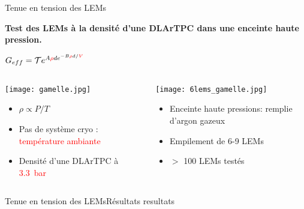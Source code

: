     \begin{frame}{Tenue en tension des LEMs}
    	\begin{scriptsize}
    		\begin{center}
    			\textbf{Test des LEMs à la densité d'une DLArTPC dans une enceinte haute pression.}\\
    			\begin{normalsize}
        			$G _{eff}= \mathcal{T}e^{A\textcolor{red}{\rho} d e^{-B\textcolor{red}{\rho}d/\textcolor{red}{V}}}$
    			\end{normalsize}
    		\end{center} 
    		\begin{columns}
		    	\begin{column}{0.5\textwidth}
		    		\texttt{[image: gamelle.jpg]}\\
		    		\begin{itemize}
		    			\item $\rho \propto P/T$
		    			\item Pas de système cryo : \textcolor{red}{température ambiante}
		    			\item Densité d'une DLArTPC à \textcolor{red}{\SI{3.3}{\bar}}
		    		\end{itemize}
		    	\end{column}\hfill
		    	\begin{column}{0.5\textwidth}
		    		\texttt{[image: 6lems\_gamelle.jpg]}\\
		    		\begin{itemize}
		    			\item Enceinte haute pressions: remplie d'argon gazeux
		    			\item Empilement de 6-9 LEMs
		    			\item $>$ 100 LEMs testés
		    		\end{itemize}
		    	\end{column}
		    \end{columns}
	    \end{scriptsize} 
    \end{frame}
    
    \begin{frame}{Tenue en tension des LEMs}{Résultats}
        resultats
    \end{frame}

